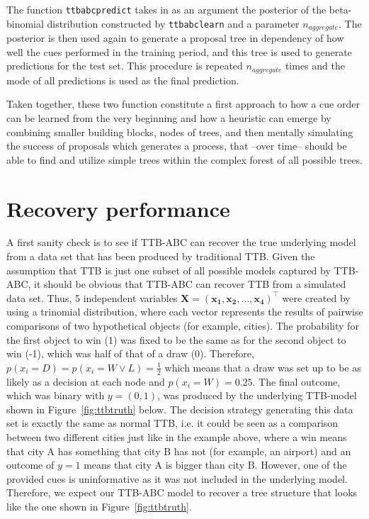 \documentclass[a4paper,man, natbib]{apa6}
\begin{document}
The function \texttt{ttbabcpredict} takes in as an argument the posterior of the beta-binomial distribution constructed by \texttt{ttbabclearn} and a parameter $n_{aggregate}$.  The posterior is then used again to generate a proposal tree in dependency of how well the cues performed in the training period, and this tree is used to generate predictions for the test set. This procedure is repeated  $n_{aggregate}$ times and the mode of all predictions is used as the final prediction.

Taken together, these two function constitute a first approach to how a cue order can be learned from the very beginning and how a heuristic can emerge by combining smaller building blocks, nodes of trees, and then mentally simulating the success of proposals which generates a process, that --over time-- should be able to find and utilize simple trees within the complex forest of all possible trees.  %



\section{Recovery performance}
A first sanity check is to see if TTB-ABC can recover the true underlying model from a data set that has been produced by traditional TTB. Given the assumption that  TTB is just one subset of all possible models captured by  TTB-ABC, it should be obvious that TTB-ABC can recover TTB from a simulated data set. Thus, 5 independent variables $\mathbf{X=(x_1,x_2, \dots, x_4)}^\top$ were created by using a trinomial distribution, where each vector represents the results of pairwise comparisons of two hypothetical objects (for example, cities). The probability for the first object to win (1) was fixed to be the same as for the second object to win (-1), which was half of that of a draw (0). Therefore, $p(x_i=D)=p(x_i=W \lor L)=\frac{1}{2}$ which means that a draw was set up to be as likely as a decision at each node and $p(x_i=W)=0.25$. The final outcome, which was binary with $y=(0,1)$, was produced by the underlying TTB-model shown in Figure~\ref{fig:ttbtruth} below. The decision strategy generating this data set is exactly the same as normal TTB, i.e. it could be seen as a comparison between two different cities just like in the example above, where a win means that city A has something that city B has not (for example, an airport) and an outcome of $y=1$ means that city A is bigger than city B. However, one of the provided cues is uninformative as it was not included in the underlying model. Therefore, we expect our TTB-ABC model to recover a tree structure that looks like the one shown in Figure~\ref{fig:ttbtruth}.
\end{document}

